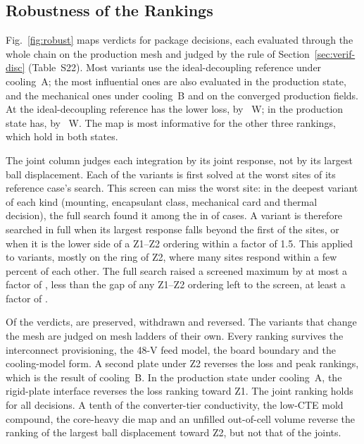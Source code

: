 \subsection{Robustness of the Rankings}\label{sec:explore-robust}
Fig.~\ref{fig:robust} maps \WrRobN{} verdicts for \WrRobCases{} package decisions, each evaluated
through the whole chain on the production mesh and judged by the rule of
Section~\ref{sec:verif-disc} (Table~S22). Most variants use the ideal-decoupling reference under
cooling~A; the most influential ones are also evaluated in the production state, and the
mechanical ones under cooling~B and on the converged production fields. At the
ideal-decoupling reference \WrLowRefA{} has the lower loss, by \LossGapZtwoSzero~W; in the
production state \WrLowA{} has, by \GapAZtwo~W. \WrDecapRankSent{} The map is most informative for
the other three rankings, which hold in both states.

The joint column judges each integration by its joint response, not by its largest ball
displacement. Each of the \MvScrNvar{} variants is first solved at the \MvScrK{} worst sites of its
reference case's search. This screen can
miss the worst site: in the deepest variant of each kind (mounting, encapsulant class, mechanical
card and thermal decision), the full search found it among the \MvScrK{} in \MvScrValInTopKWord{} of
\MvScrValNWord{} cases. A variant is therefore searched in full when its largest response falls beyond
the first \MvScrEscFracWord{} of the \MvScrK{} sites, or when it is the lower side of a Z1--Z2 ordering
within a factor of 1.5. This applied to \MvScrEscN{} variants, mostly on the ring of Z2, where many
sites respond within a few percent of each other. The full search raised a screened maximum by at
most a factor of \MvScrEscShortFactor, less than the gap of any Z1--Z2 ordering left to the screen,
at least a factor of \MvScrGapScreenMin.

Of the verdicts, \WrRobPreserved{} are preserved, \WrRobWithdrawnWord{} withdrawn and \WrRobReversedWord{}
reversed. The variants that change the mesh are judged on mesh ladders of their own. Every ranking survives the interconnect
provisioning, the 48-V feed model, the board boundary and the cooling-model form. A second plate
under Z2 reverses the loss and peak rankings, which is the result of cooling~B. In the production
state under cooling~A, the rigid-plate interface reverses the loss ranking toward Z1. The joint
ranking holds for all \WrRobJointPreserved{} decisions. A tenth of the converter-tier conductivity, the low-CTE mold compound, the
core-heavy die map and an unfilled out-of-cell volume reverse the ranking of the largest ball displacement toward Z2, but not that of
the joints.

